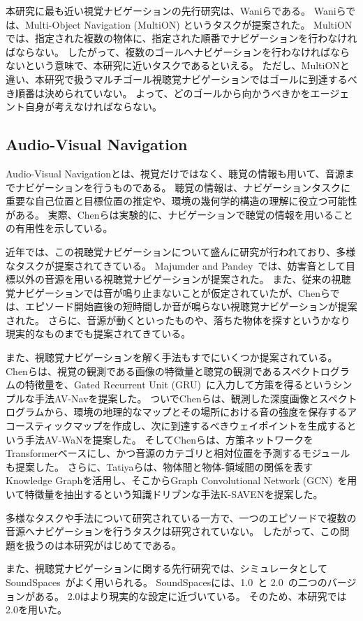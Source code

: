 本研究に最も近い視覚ナビゲーションの先行研究は、Waniら\cite{wani2020multion}である。
Waniら\cite{wani2020multion}では、Multi-Object Navigation (MultiON) というタスクが提案された。
MultiONでは、指定された複数の物体に、指定された順番でナビゲーションを行わなければならない。
したがって、複数のゴールへナビゲーションを行わなければならないという意味で、本研究に近いタスクであるといえる。
ただし、MultiONと違い、本研究で扱うマルチゴール視聴覚ナビゲーションではゴールに到達するべき順番は決められていない。
よって、どのゴールから向かうべきかをエージェント自身が考えなければならない。


\subsection{Audio-Visual Navigation}

Audio-Visual Navigationとは、視覚だけではなく、聴覚の情報も用いて、音源までナビゲーションを行うものである。
聴覚の情報は、ナビゲーションタスクに重要な自己位置と目標位置の推定や、環境の幾何学的構造の理解に役立つ可能性がある。
実際、Chenら\cite{chen2020soundspaces}は実験的に、ナビゲーションで聴覚の情報を用いることの有用性を示している。

近年では、この視聴覚ナビゲーションについて盛んに研究が行われており、多様なタスクが提案されてきている。
Majumder and Pandey~\cite{majumdersemantic}では、妨害音として目標以外の音源を用いる視聴覚ナビゲーションが提案された。
また、従来の視聴覚ナビゲーションでは音が鳴り止まないことが仮定されていたが、Chenら\cite{chen2021semantic}では、エピソード開始直後の短時間しか音が鳴らない視聴覚ナビゲーションが提案された。
さらに、音源が動くといったもの\cite{younes2021catch, yu2021sound}や、落ちた物体を探すというかなり現実的なもの\cite{gan2022finding}までも提案されてきている。

また、視聴覚ナビゲーションを解く手法もすでにいくつか提案されている。
Chenら\cite{chen2020soundspaces}は、視覚の観測である画像の特徴量と聴覚の観測であるスペクトログラムの特徴量を、Gated Recurrent Unit (GRU)~\cite{chung2014empirical}に入力して方策を得るというシンプルな手法AV-Navを提案した。
ついでChenら\cite{chen2020learning}は、観測した深度画像とスペクトログラムから、環境の地理的なマップとその場所における音の強度を保存するアコースティックマップを作成し、次に到達するべきウェイポイントを生成するという手法AV-WaNを提案した。
そしてChenら\cite{chen2021semantic}は、方策ネットワークをTransformerベースにし、かつ音源のカテゴリと相対位置を予測するモジュールも提案した。
さらに、Tatiyaら\cite{tatiya2022knowledge}は、物体間と物体-領域間の関係を表すKnowledge Graphを活用し、そこからGraph Convolutional Network (GCN)~\cite{kipf2017semisupervised}を用いて特徴量を抽出するという知識ドリブンな手法K-SAVENを提案した。

多様なタスクや手法について研究されている一方で、一つのエピソードで複数の音源へナビゲーションを行うタスクは研究されていない。
したがって、この問題を扱うのは本研究がはじめてである。

また、視聴覚ナビゲーションに関する先行研究では、シミュレータとしてSoundSpaces~\cite{chen2020soundspaces, chen2022soundspaces}がよく用いられる。
SoundSpacesには、1.0~\cite{chen2020soundspaces}と 2.0~\cite{chen2022soundspaces}の二つのバージョンがある。
2.0はより現実的な設定に近づいている。
そのため、本研究では2.0を用いた。


